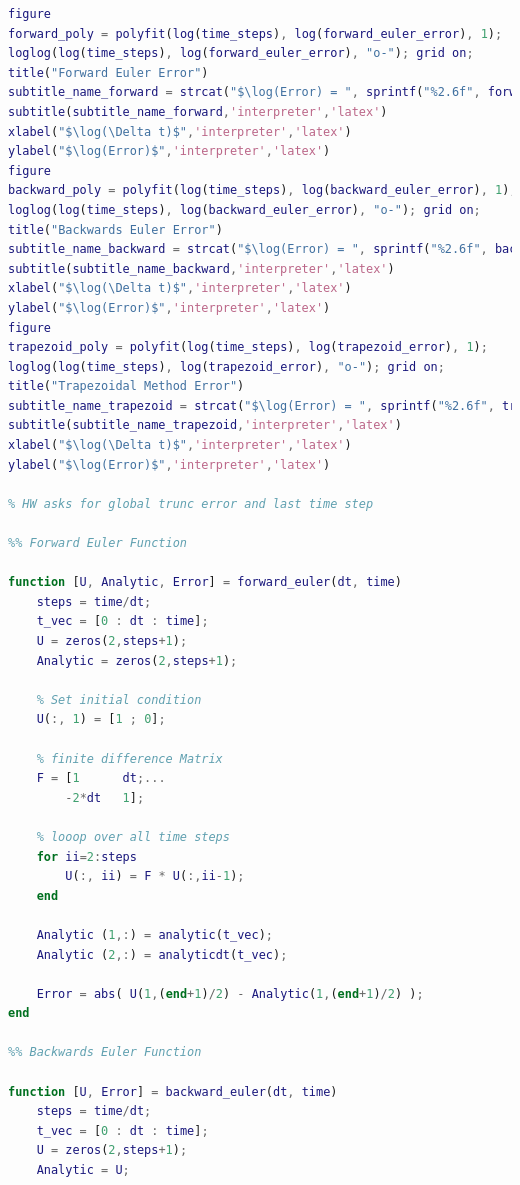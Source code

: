 \documentclass[12pt,letterpaper]{article}
\begin{document}
\begin{lstlisting}[language = Matlab]
% Error plotting
figure
forward_poly = polyfit(log(time_steps), log(forward_euler_error), 1);
loglog(log(time_steps), log(forward_euler_error), "o-"); grid on;
title("Forward Euler Error")
subtitle_name_forward = strcat("$\log(Error) = ", sprintf("%2.6f", forward_poly(1)), "\log(\Delta t) + ", sprintf("%2.6f", forward_poly(2)), "$");
subtitle(subtitle_name_forward,'interpreter','latex')
xlabel("$\log(\Delta t)$",'interpreter','latex')
ylabel("$\log(Error)$",'interpreter','latex')
figure
backward_poly = polyfit(log(time_steps), log(backward_euler_error), 1);
loglog(log(time_steps), log(backward_euler_error), "o-"); grid on;
title("Backwards Euler Error")
subtitle_name_backward = strcat("$\log(Error) = ", sprintf("%2.6f", backward_poly(1)), "\log(\Delta t) + ", sprintf("%2.6f", backward_poly(2)), "$");
subtitle(subtitle_name_backward,'interpreter','latex')
xlabel("$\log(\Delta t)$",'interpreter','latex')
ylabel("$\log(Error)$",'interpreter','latex')
figure
trapezoid_poly = polyfit(log(time_steps), log(trapezoid_error), 1);
loglog(log(time_steps), log(trapezoid_error), "o-"); grid on;
title("Trapezoidal Method Error")
subtitle_name_trapezoid = strcat("$\log(Error) = ", sprintf("%2.6f", trapezoid_poly(1)), "\log(\Delta t) + ", sprintf("%2.6f", trapezoid_poly(2)), "$");
subtitle(subtitle_name_trapezoid,'interpreter','latex')
xlabel("$\log(\Delta t)$",'interpreter','latex')
ylabel("$\log(Error)$",'interpreter','latex')

% HW asks for global trunc error and last time step

%% Forward Euler Function

function [U, Analytic, Error] = forward_euler(dt, time)
    steps = time/dt;
    t_vec = [0 : dt : time]; 
    U = zeros(2,steps+1);
    Analytic = zeros(2,steps+1);
    
    % Set initial condition
    U(:, 1) = [1 ; 0];
    
    % finite difference Matrix
    F = [1      dt;...
        -2*dt   1];
    
    % looop over all time steps
    for ii=2:steps
        U(:, ii) = F * U(:,ii-1);
    end
    
    Analytic (1,:) = analytic(t_vec);
    Analytic (2,:) = analyticdt(t_vec);

    Error = abs( U(1,(end+1)/2) - Analytic(1,(end+1)/2) );
end

%% Backwards Euler Function

function [U, Error] = backward_euler(dt, time)
    steps = time/dt;
    t_vec = [0 : dt : time]; 
    U = zeros(2,steps+1);
    Analytic = U;
    

\end{lstlisting}
\end{document}
